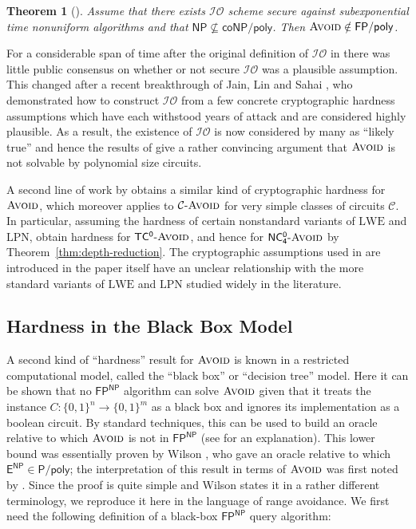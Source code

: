 \documentclass[11pt]{article}
\newtheorem{theorem}{Theorem}
\newcommand{\todo}[1]{\textcolor{red}{TODO: #1}}
\newcommand{\dash}{\text{-}}
\newcommand{\B}{\{0,1\}}
\newcommand{\avoid}{\textsc{Avoid}}
\begin{document}
\begin{theorem}[\cite{avoid-io}]\label{thm:avoid-io}
Assume that there exists $\mathcal{IO}$ scheme secure against subexponential time nonuniform algorithms and that $\mathsf{NP} \not\subseteq \mathsf{coNP/poly}$. Then $\avoid \notin \mathsf{FP/poly}$.
\end{theorem}

For a considerable span of time after the original definition of $\mathcal{IO}$ in \cite{obfuscation} there was little public consensus on whether or not secure $\mathcal{IO}$ was a plausible assumption. This changed after a recent breakthrough of Jain, Lin and Sahai \cite{JLS}, who demonstrated how to construct $\mathcal{IO}$ from a few concrete cryptographic hardness assumptions which have each withstood years of attack and are considered highly plausible. As a result, the existence of $\mathcal{IO}$ is now considered by many as ``likely true'' and hence the results of \cite{avoid-io} give a rather convincing argument that $\avoid$ is not solvable by polynomial size circuits.

A second line of work by \cite{hardness-lwe} obtains a similar kind of cryptographic hardness for $\avoid$, which moreover applies to $\mathcal{C}\dash\avoid$ for very simple classes of circuits $\mathcal{C}$. In particular, assuming the hardness of certain nonstandard variants of $\mathrm{LWE}$ and $\mathrm{LPN}$, \cite{hardness-lwe} obtain hardness for $\mathsf{TC^0}\dash\avoid$, and hence for $\mathsf{NC^0_4}\dash\avoid$ by Theorem~\ref{thm:depth-reduction}. The cryptographic assumptions used in \cite{hardness-lwe} are introduced in the paper itself have an unclear relationship with the more standard variants of  $\mathrm{LWE}$ and $\mathrm{LPN}$ studied widely in the literature.



\subsection{Hardness in the Black Box Model}\label{sec:black-box}
A second kind of ``hardness'' result for $\avoid$ is known in a restricted computational model, called the ``black box'' or ``decision tree'' model. Here it can be shown that no $\mathsf{FP^{NP}}$ algorithm can solve $\avoid$ given that it treats the instance $C: \B^n \to \B^m$ as a black box and ignores its implementation as a boolean circuit. By standard techniques, this can be used to build an oracle relative to which $\avoid$ is not in $\mathsf{FP^{NP}}$ (see \cite{vyas-williams} for an explanation). This lower bound was essentially proven by Wilson \cite{wilson}, who gave an oracle relative to which $\mathsf{E^{NP}} \in \mathsf{P/poly}$; the interpretation of this result in terms of $\avoid$ was first noted by \cite{vyas-williams}. Since the proof is quite simple and Wilson states it in a rather different terminology, we reproduce it here in the language of range avoidance. We first need the following definition of a black-box $\mathsf{FP^{NP}}$ query algorithm:
\end{document}
